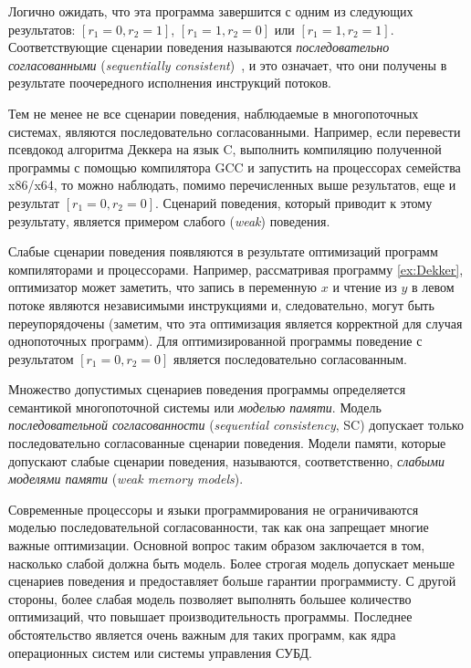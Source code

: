 Логично ожидать, что эта программа 
завершится с одним из следующих результатов: 
${[r_1=0, r_2=1]}$, ${[r_1=1,r_2=0]}$ или ${[r_1=1,r_2=1]}$. Соответствующие сценарии поведения 
называются \emph{последовательно согласованными} 
(\emph{sequentially consistent})~\cite{Lamport:TC79}, и это означает, 
что они получены в результате поочередного 
исполнения инструкций потоков. 



Тем не менее не все сценарии поведения, наблюдаемые в
многопоточных  системах, являются последовательно согласованными.
Например, если перевести псевдокод алгоритма Деккера
на язык C, выполнить компиляцию полученной программы с помощью компилятора GCC
и  запустить  на процессорах семейства x86/x64, то
можно  наблюдать, помимо перечисленных выше результатов, еще и результат  $[r_1=0, r_2=0]$. 
Сценарий поведения, который приводит к этому результату, является примером  слабого (\emph{weak}) поведения.

Слабые сценарии поведения появляются в результате оптимизаций программ
компиляторами и процессорами. Например, 
рассматривая программу \ref{ex:Dekker}, 
оптимизатор может заметить, что запись в переменную $x$
и чтение из $y$ в левом потоке являются независимыми инструкциями 
и, следовательно, могут быть переупорядочены
(заметим, что эта оптимизация является корректной 
для случая однопоточных программ).
Для оптимизированной программы поведение с результатом
$[r_1=0, r_2=0]$ является последовательно согласованным.

Множество допустимых сценариев поведения программы определяется
семантикой многопоточной системы или \emph{моделью памяти}.
Модель \emph{последовательной согласованности}
(\emph{sequential consistency}, SC) допускает 
только последовательно согласованные сценарии поведения.
Модели памяти, которые   допускают слабые сценарии поведения, 
называются, соответственно, \emph{слабыми моделями памяти}
(\emph{weak memory models}).

Современные процессоры и языки программирования 
не ограничиваются моделью последовательной согласованности, 
так как она запрещает многие важные оптимизации.
Основной вопрос таким образом заключается в том, насколько слабой 
должна быть модель. Более строгая модель допускает меньше сценариев поведения 
и предоставляет больше гарантии программисту.
С другой стороны, более слабая модель позволяет
выполнять большее количество оптимизаций, что повышает производительность программы. Последнее обстоятельство является очень важным для таких программ, как ядра операционных систем или системы управления СУБД. 

